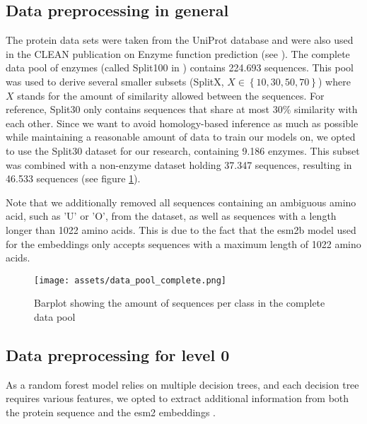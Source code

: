 \documentclass{bioinfo}
\begin{document}
\begin{methods}
\subsection{Data preprocessing in general}

The protein data sets were taken from the UniProt database and were also used in the CLEAN publication on Enzyme function prediction (see \cite{CleanArticle}). 
The complete data pool of enzymes (called Split100 in \cite{CLEANgit}) contains 224.693 sequences. 
This pool was used to derive several smaller subsets (SplitX, $X \in \left\{10, 30, 50, 70\right\}$) where $X$ stands for the amount of similarity allowed between the sequences.
For reference, Split30 only contains sequences that share at most 30\% similarity with each other.
Since we want to avoid homology-based inference as much as possible while 
maintaining a reasonable amount of data to train our models on, we opted to use the Split30 dataset for our research,
containing 9.186 enzymes. This subset was combined with a non-enzyme dataset holding 37.347 sequences, resulting in 46.533 sequences (see figure \ref{fig:DataPoolDist}).

Note that we additionally removed all sequences containing an ambiguous amino acid, such as 'U' or 'O', from the dataset, as well as
sequences with a length longer than 1022 amino acids. 
This is due to the fact that the esm2b model used for the embeddings only accepts sequences 
with a maximum length of 1022 amino acids. 

\begin{figure}[!htbp]
\texttt{[image: assets/data\_pool\_complete.png]}
\caption{Barplot showing the amount of sequences per class in the complete data pool}\label{fig:DataPoolDist}
\end{figure}

\subsection{Data preprocessing for level 0}
As a random forest model relies on multiple decision trees, and each decision tree requires various features,
we opted to extract additional information from both the protein sequence and the esm2 embeddings \cite{ESM2}.


\end{methods}
\end{document}
